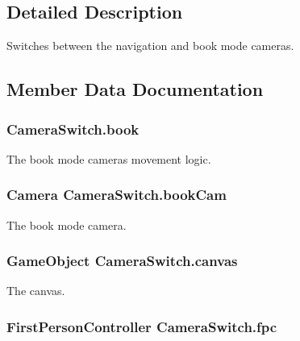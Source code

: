 \subsection{Detailed Description}
Switches between the navigation and book mode cameras. 



\subsection{Member Data Documentation}
\subsubsection[{book}]{ Camera\+Switch.\+book}\label{class_camera_switch_a4bb33fead2f75f066977849be4f0759b}


The book mode camera\textquotesingle{}s movement logic. 

\subsubsection[{book\+Cam}]{\setlength{\rightskip}{0pt plus 5cm}Camera Camera\+Switch.\+book\+Cam}\label{class_camera_switch_a6d303d4cb4dd6983e12c3e26417efeca}


The book mode camera. 

\subsubsection[{canvas}]{\setlength{\rightskip}{0pt plus 5cm}Game\+Object Camera\+Switch.\+canvas}\label{class_camera_switch_a5877253af2d76ac5a6c02c8509fd3a73}


The canvas. 

\subsubsection[{fpc}]{\setlength{\rightskip}{0pt plus 5cm}First\+Person\+Controller Camera\+Switch.\+fpc}\label{class_camera_switch_a29f086892b51afb2bf09849fd70b6e9b}


